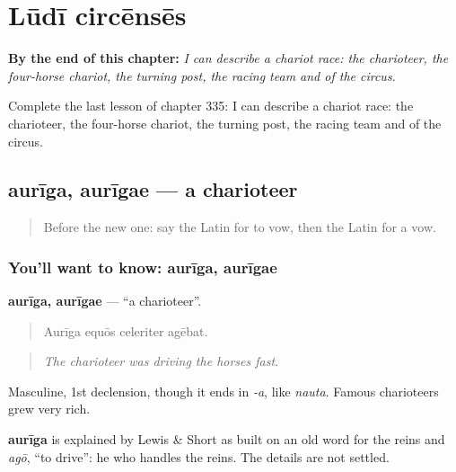 
\chapter{Lūdī circēnsēs}
\label{ch:la-ludi-circenses}

\begin{chapteropening}
\textbf{By the end of this chapter:} \emph{I can describe a chariot race: the charioteer, the four-horse chariot, the turning post, the racing team and of the circus.}

Complete the last lesson of chapter 335: I can describe a chariot race: the charioteer, the four-horse chariot, the turning post, the racing team and of the circus.
\end{chapteropening}

\section[aurīga, aurīgae]{aurīga, aurīgae — a charioteer}

\label{lesson:LA-C335-auriga}



\begin{quote}
Before the new one: say the Latin for to vow, then the Latin for a vow.
\end{quote}

\subsection*{You'll want to know: aurīga, aurīgae}
\textbf{aurīga, aurīgae} — \textquotedblleft{}a charioteer\textquotedblright{}.

\begin{quote}
Aurīga equōs celeriter agēbat.
\end{quote}

\begin{quote}
\emph{The charioteer was driving the horses fast.}
\end{quote}

Masculine, 1st declension, though it ends in \emph{-a}, like \emph{nauta}. Famous charioteers grew very rich.

\begin{cousinweb}
\textbf{aurīga} is explained by Lewis \& Short as built on an old word for the reins and \emph{agō}, \textquotedblleft{}to drive\textquotedblright{}: he who handles the reins. The details are not settled.
\end{cousinweb}

